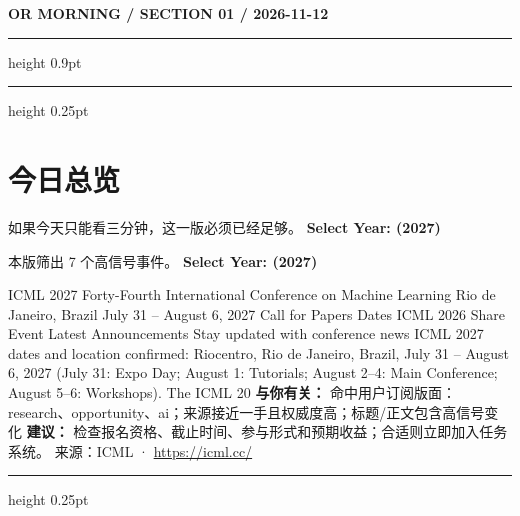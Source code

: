 \documentclass[10.5pt]{ctexart}
\begin{document}
{\small\bfseries OR MORNING / SECTION 01 / 2026-11-12}
\vspace{2mm}
\hrule height 0.9pt
\vspace{1.5mm}
\hrule height 0.25pt
\vspace{4mm}
\section*{今日总览}
{\color{ormuted} 如果今天只能看三分钟，这一版必须已经足够。}
\vspace{2mm}
{\fontsize{25}{29}\selectfont\bfseries Select Year: (2027)}\par
\vspace{2mm}
{\large 本版筛出 7 个高信号事件。}
\vspace{3mm}
{\Large\bfseries Select Year: (2027)}\par
ICML 2027 Forty-Fourth International Conference on Machine Learning Rio de Janeiro, Brazil July 31 – August 6, 2027 Call for Papers Dates ICML 2026 Share Event Latest Announcements Stay updated with conference news ICML 2027 dates and location confirmed: Riocentro, Rio de Janeiro, Brazil, July 31 – August 6, 2027 (July 31: Expo Day; August 1: Tutorials; August 2–4: Main Conference; August 5–6: Workshops). The ICML 20
\textbf{与你有关：} 命中用户订阅版面：research、opportunity、ai；来源接近一手且权威度高；标题/正文包含高信号变化
\textbf{建议：} 检查报名资格、截止时间、参与形式和预期收益；合适则立即加入任务系统。
{\footnotesize\color{ormuted} 来源：ICML · \url{https://icml.cc/}}
\vspace{3mm}
\hrule height 0.25pt
\vspace{3mm}
\end{document}
